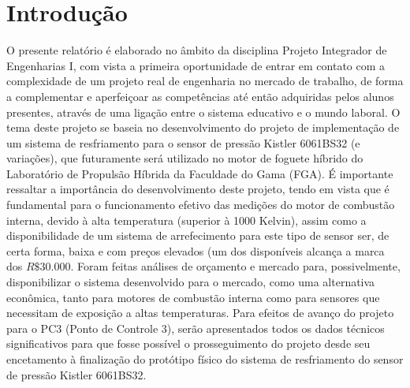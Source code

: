 \chapter{Introdução}
O presente relatório é elaborado no âmbito da disciplina Projeto Integrador de Engenharias I, com vista a primeira oportunidade de entrar em contato com a complexidade de um projeto real de engenharia no mercado de trabalho, de forma a complementar e aperfeiçoar as competências até então adquiridas pelos alunos presentes, através de uma ligação entre o sistema educativo e o mundo laboral. O tema deste projeto se baseia no desenvolvimento do projeto de implementação de um sistema de resfriamento para o sensor de pressão Kistler 6061BS32 (e variações), que futuramente será utilizado no motor de foguete híbrido do Laboratório de Propulsão Híbrida da Faculdade do Gama (FGA). É importante ressaltar a importância do desenvolvimento deste projeto, tendo em vista que é fundamental para o funcionamento efetivo das medições do motor de combustão interna, devido à alta temperatura (superior à 1000 Kelvin), assim como a disponibilidade de um sistema de arrefecimento para este tipo de sensor ser, de certa forma, baixa e com preços elevados (um dos disponíveis alcança a marca dos $R\$30.000$. Foram feitas análises de orçamento e mercado para, possivelmente, disponibilizar o sistema desenvolvido para o mercado, como uma alternativa econômica, tanto para motores de combustão interna como para sensores que necessitam de exposição a altas temperaturas. Para efeitos de avanço do projeto para o PC3 (Ponto de Controle 3), serão apresentados todos os dados técnicos significativos para que fosse possível o prosseguimento do projeto desde seu encetamento à finalização do protótipo físico do sistema de resfriamento do sensor de pressão Kistler 6061BS32.  
